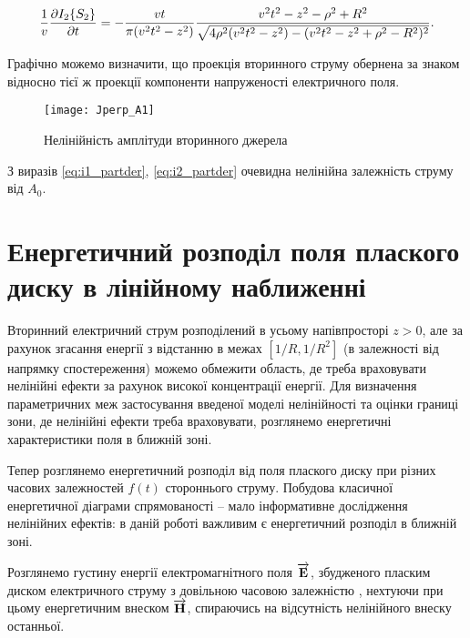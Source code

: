%
\begin{equation} \begin{aligned} \label{eq:i2_partder}
\frac{1}{v} \frac{\partial  I_2 \{ S_2 \} }{\partial t} = 
- \frac{vt}{\pi (v^2t^2 - z^2) } \frac{ v^2t^2 - z^2 - \rho^2 + R^2 } 
{ \sqrt{ 4 \rho^2 (v^2t^2 - z^2) - (v^2t^2 - z^2 + \rho^2 - R^2)^2 } }.
\end{aligned} \end{equation}

Графічно можемо визначити, що проекція вторинного струму обернена за знаком 
відносно тієї ж проекції компоненти напруженості електричного поля.

\begin{figure}[h] \begin{center}
\texttt{[image: Jperp\_A1]}
\caption{Нелінійність амплітуди вторинного джерела}
\label{fig:jx_secondary}
\end{center} \end{figure}

З виразів \eqref{eq:i1_partder}, \eqref{eq:i2_partder} очевидна нелінійна 
залежність струму від $ A_0 $.

\section{Енергетичний розподіл поля плаского диску в лінійному наближенні}

Вторинний електричний струм розподілений в усьому напівпросторі $ z > 0 $,
але за рахунок згасання енергії з відстанню в межах $ [1/R, 1/R^2] $ (в 
залежності від напрямку спостереження) можемо обмежити область, де треба 
враховувати нелінійні ефекти за рахунок високої концентрації енергії. Для 
визначення параметричних меж застосування введеної моделі нелінійності та 
оцінки границі зони, де нелінійні ефекти треба враховувати, розглянемо 
енергетичні характеристики поля в ближній зоні.

Тепер розглянемо енергетичний розподіл від поля плаского диску при різних
часових залежностей $ f(t) $ стороннього струму. Побудова класичної 
енергетичної діаграми спрямованості -- мало інформативне дослідження 
нелінійних ефектів: в даній роботі важливим є енергетичний розподіл в 
ближній зоні.

Розглянемо густину енергії електромагнітного поля $ \overrightarrow{\mathbf E} $, збудженого 
пласким диском електричного струму з довільною часовою залежністю
\cite{imp:Schantz2018}, нехтуючи при цьому енергетичним внеском 
$ \overrightarrow{\mathbf H} $, спираючись на відсутність нелінійного внеску останньої.


